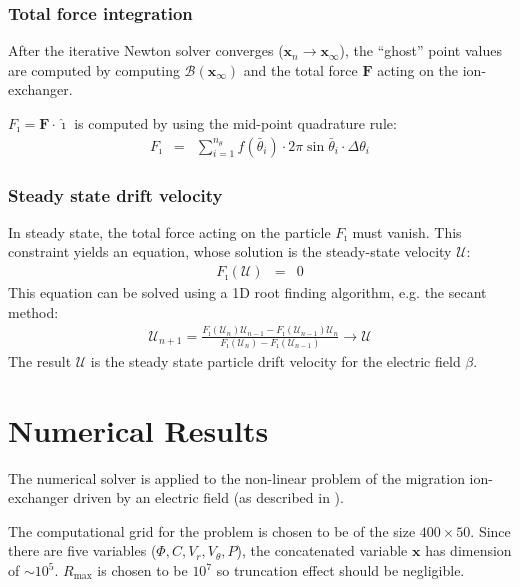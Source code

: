 \documentclass[final]{elsarticle}
\newcommand\bF{\boldsymbol{F}}
\newcommand\bx{\boldsymbol{x}}
\newcommand\cB{\mathcal{B}}
\newcommand\cU{\mathscr{U}}
\newcommand\ui{\boldsymbol{\hat{\imath}}}
\begin{document}
\subsubsection{Total force integration}
After the iterative Newton solver converges ($\bx_n \rightarrow \bx_\infty$), 
the ``ghost'' point values are computed by computing $\cB(\bx_\infty)$ and
the total force $\bF$ acting on the ion-exchanger.

$F_\imath = \bF \cdot \ui$ is computed by using the mid-point quadrature rule:
\begin{eqnarray*}
F_\imath &=& \sum_{i=1}^{n_\theta} f(\bar\theta_i) \cdot 
              2 \pi \sin\bar\theta_i \cdot \Delta\theta_i
\end{eqnarray*}

\subsubsection{Steady state drift velocity}
In steady state, the total force acting on the particle $F_\imath$ must vanish.
This constraint yields an equation, whose solution is the steady-state velocity $\cU$:
\begin{eqnarray*}
F_\imath(\cU) &=& 0
\end{eqnarray*}
This equation can be solved using a 1D root finding algorithm, e.g. the secant method:
\begin{eqnarray*}
\cU_{n+1} = \frac{F_\imath(\cU_{n})\cU_{n-1} - F_\imath(\cU_{n-1})\cU_{n}}
{F_\imath(\cU_{n}) - F_\imath(\cU_{n-1})} \rightarrow \cU
\end{eqnarray*}
The result $\cU$ is the 
steady state particle drift velocity for the electric field $\beta$.

\section{Numerical Results} \label{sec:results}
The numerical solver is applied to the non-linear problem of the migration ion-exchanger
driven by an electric field (as described in \cite{yariv2010migration}). 

The computational grid for the problem is chosen to be of the size $400 \times 50$.
Since there are five variables ($\varPhi, C, V_r, V_\theta, P$), the concatenated
variable $\bx$ has dimension of $\sim 10^5$.
$R_{\max}$ is chosen to be $10^{7}$ so truncation effect should be negligible.
\end{document}
